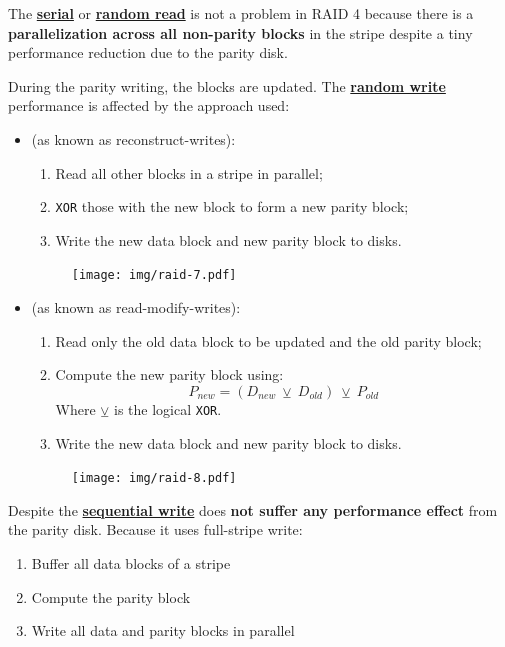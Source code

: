 \noindent
The \textbf{\underline{serial}} or \textbf{\underline{random read}} is not a problem in RAID 4 because there is a \textbf{parallelization across all non-parity blocks} in the stripe despite a tiny performance reduction due to the parity disk.

\newpage

\noindent
During the parity writing, the blocks are updated. The \textbf{\underline{random write}} performance is affected by the approach used:
\begin{itemize}
    \item {} (as known as reconstruct-writes):
    \begin{enumerate}
        \item Read all other blocks in a stripe in parallel;
        \item \texttt{XOR} those with the new block to form a new parity block;
        \item Write the new data block and new parity block to disks.
    \end{enumerate}
    \begin{figure}[!htp]
        \centering
        \texttt{[image: img/raid-7.pdf]}
    \end{figure}

    \item {} (as known as read-modify-writes):
    \begin{enumerate}
        \item Read only the old data block to be updated and the old parity block;
        \item Compute the new parity block using:
        \begin{equation*}
            P_{new} = \left(D_{new} \:\veebar\: D_{old}\right) \:\veebar\: P_{old}
        \end{equation*}
        Where $\veebar$ is the logical \texttt{XOR}.
        \item Write the new data block and new parity block to disks.
    \end{enumerate}
    \begin{figure}[!htp]
        \centering
        \texttt{[image: img/raid-8.pdf]}
    \end{figure}
\end{itemize}
Despite the \textbf{\underline{sequential write}} does \textbf{not suffer any performance effect} from the parity disk. Because it uses full-stripe write:
\begin{enumerate}
    \item Buffer all data blocks of a stripe
    \item Compute the parity block
    \item Write all data and parity blocks in parallel\cite{raid-and-data-integrity-slides}
\end{enumerate}

